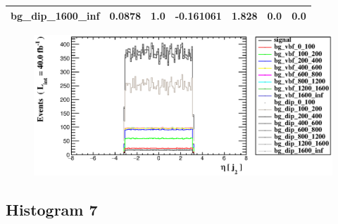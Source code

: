 \documentclass[a4paper, 10pt]{article}
\begin{document}
\begin{table}[H]
\begin{center}
\begin{tabular}{|m{23.0mm}|m{23.0mm}|m{18.0mm}|m{19.0mm}|m{19.0mm}|m{19.0mm}|m{19.0mm}|}
      \hline
      {\cellcolor{white}         bg\_dip\_1600\_inf}& {\cellcolor{white}         0.0878}& {\cellcolor{white}         1.0}& {\cellcolor{white}         -0.161061}& {\cellcolor{white}         1.828}& {\cellcolor{green}         0.0}& {\cellcolor{green}         0.0}\\
\hline
    \end{tabular}
  \end{center}
\end{table}

\begin{figure}[H]
  \begin{center}
    \includegraphics[scale=0.45]{selection_5.eps}\\
\caption{   }
  \end{center}
\end{figure}
      \newpage
\subsection{ Histogram 7}
\end{document}
